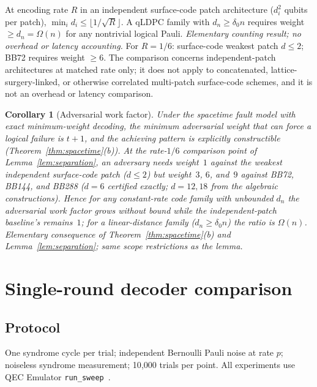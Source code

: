 \documentclass[11pt,a4paper]{article}
\newtheorem{corollary}{Corollary}\newtheorem{proposition}{Proposition}
\begin{document}
\begin{lemma}\label{lem:separation}
At encoding rate $R$ in an independent surface-code patch architecture
($d_i^2$ qubits per patch), $\min_i d_i\le\lfloor1/\!\sqrt{R}\rfloor$.
A qLDPC family with $d_n\ge\delta_0 n$ requires weight $\ge d_n=\Omega(n)$
for any nontrivial logical Pauli.
\emph{Elementary counting result; no overhead or latency accounting.}
For $R=1/6$: surface-code weakest patch $d\le2$; BB72 requires weight $\ge6$.
The comparison concerns independent-patch architectures at matched rate
only; it does not apply to concatenated, lattice-surgery-linked, or
otherwise correlated multi-patch surface-code schemes, and it is not an
overhead or latency comparison.
\end{lemma}

\begin{corollary}[Adversarial work factor]\label{cor:workfactor}
Under the spacetime fault model with exact minimum-weight decoding, the
minimum adversarial weight that can force a logical failure is
$t{+}1$, and the achieving pattern is explicitly constructible
(Theorem~\ref{thm:spacetime}(b)). At the rate-$1/6$ comparison point
of Lemma~\ref{lem:separation}, an adversary needs weight~$1$ against
the weakest independent surface-code patch ($d\le2$) but weight~$3$,
$6$, and~$9$ against BB72, BB144, and BB288 ($d=6$ certified exactly;
$d=12,18$ from the algebraic constructions). Hence for any
constant-rate code family with unbounded $d_n$ the adversarial work
factor grows without bound while the independent-patch baseline's
remains~$1$; for a linear-distance family ($d_n\ge\delta_0 n$) the
ratio is $\Omega(n)$.
\emph{Elementary consequence of Theorem~\ref{thm:spacetime}(b) and
Lemma~\ref{lem:separation}; same scope restrictions as the lemma.}
\end{corollary}

\section{Single-round decoder comparison}
\label{sec:benchmark}

\subsection{Protocol}

One syndrome cycle per trial; independent Bernoulli Pauli noise at rate $p$;
noiseless syndrome measurement; 10{,}000 trials per point.
All experiments use QEC Emulator
\texttt{run\_sweep}~\cite{AlDaajeh2026emulator}.
\end{document}
